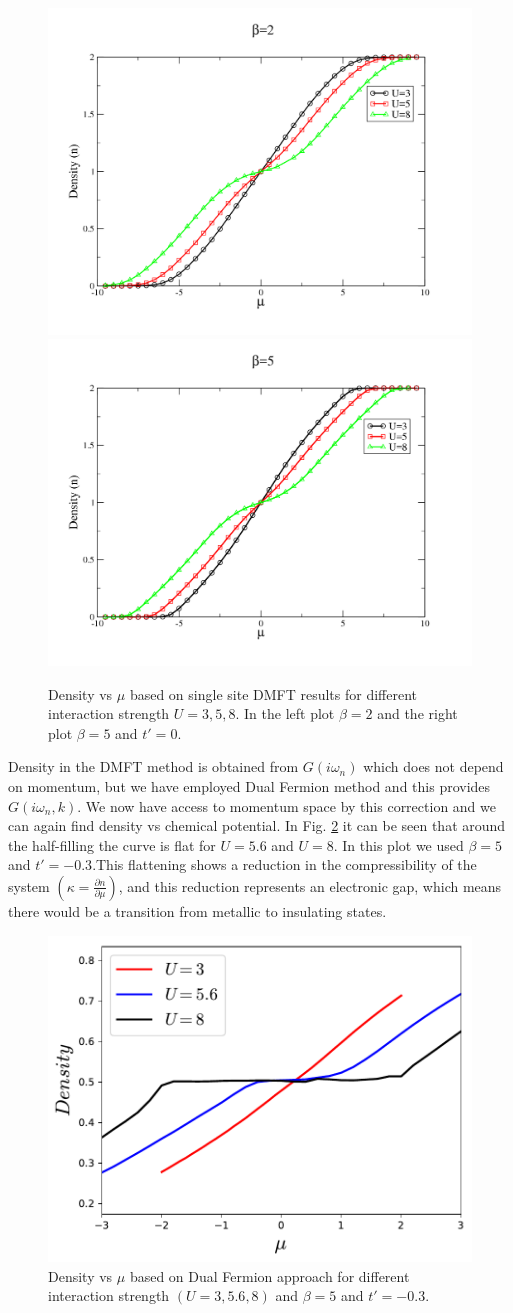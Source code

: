  \begin{figure}[ht]
\centering
    \includegraphics[width=0.47\linewidth]{fig3/density_betat.png}
    \includegraphics[width=0.47\linewidth]{fig3/density_betaf.png}
    
\caption{Density vs $\mu$ based on single site DMFT results for different interaction strength $U=3, 5, 8$. In the left plot $\beta = 2$ and the right plot $\beta = 5$ and $t'=0$.
\label{fig:density_beta}}
\end{figure}
 
 
 Density in the DMFT method is obtained from $G(i \omega _n)$ which does not depend on momentum, but we have employed Dual Fermion method and this provides $G(i \omega _n ,k)$. We now have access to momentum space by this correction and we can again find density vs chemical potential. In Fig. \ref{fig:df_density} it can be seen that around the half-filling the curve is flat for $U=5.6$ and $U=8$. In this plot we used $\beta = 5$ and $t'=-0.3$.This flattening shows a reduction in the compressibility of the system $(\kappa= \frac{\partial n}{\partial \mu})$, and this reduction represents an electronic gap, which means there would be a transition from metallic to insulating states.

 
 \begin{figure}[ht]
\centering
    \includegraphics[width=0.6\linewidth]{fig3/df_density_mu.pdf}
    
\caption{Density vs $\mu$ based on Dual Fermion approach for different interaction strength $(U=3, 5.6, 8)$ and  $\beta = 5$ and $t'=-0.3$.
\label{fig:df_density}}
\end{figure}
 
